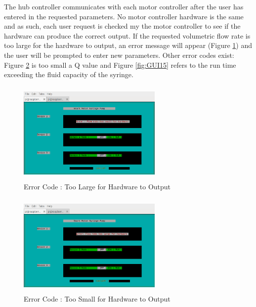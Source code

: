 \documentclass[journal]{IEEEtran}
\begin{document}
            The hub controller communicates with each motor controller after the user has entered in the requested parameters. No motor controller hardware is the same and as such, each user request is checked my the motor controller to see if the hardware can produce the correct output. If the requested volumetric flow rate is too large for the hardware to output, an error message will appear (Figure \ref{fig:GUI12}) and the user will be prompted to enter new parameters. Other error codes exist: Figure \ref{fig:GUI14} is too small a Q value and Figure \ref{fig:GUI15} refers to the run time exceeding the fluid capacity of the syringe. 
            
            \begin{figure}[H]
                \centering
                \includegraphics[width=7cm, height=5cm]{GUI_12}
                \caption{Error Code : Too Large for Hardware to Output}
                \label{fig:GUI12}
            \end{figure}
            
            \begin{figure}[H]
                \centering
                \includegraphics[width=7cm, height=5cm]{GUI_14}
                \caption{Error Code : Too Small for Hardware to Output}
                \label{fig:GUI14}
            \end{figure}
            
\end{document}
